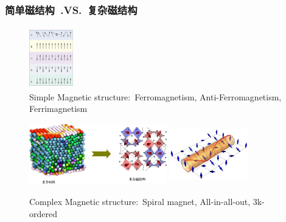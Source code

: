 \frame
{
	\frametitle{简单磁结构~\textrm{.VS.}~复杂磁结构}
\begin{figure}[h!]
\vspace*{-0.08in}
\centering
\includegraphics[height=1.05in,width=0.75in]{Figures/Magnet-simple.png}
\caption{\tiny \textrm{Simple Magnetic structure:~Ferromagnetism, Anti-Ferromagnetism, Ferrimagnetism}}%
\label{Fig:Simple-Magnet}
\end{figure}
\begin{figure}[h!]
\vspace*{-0.08in}
\centering
\includegraphics[height=1.05in,width=2.35in]{Figures/Magnet-complex-compound.png}
\hskip 0.5pt
\includegraphics[height=1.05in,width=1.35in]{Figures/Magnet-complex.png}
\caption{\tiny \textrm{Complex Magnetic structure:~Spiral magnet, All-in-all-out, 3k-ordered}}%
\label{Fig:Complex-Magnet}
\end{figure}
}


